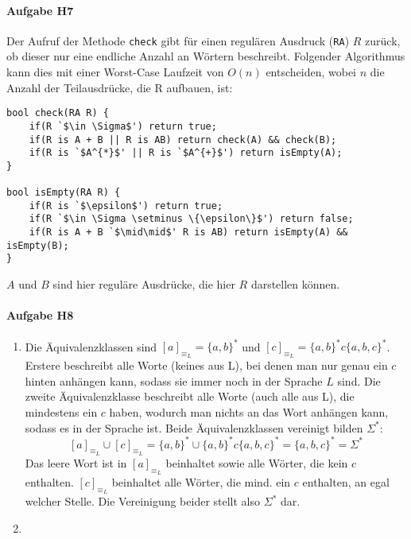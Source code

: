 \documentclass[11pt]{article}
\begin{document}

\paragraph{Aufgabe H7}
Der Aufruf der Methode \verb|check| gibt für einen regulären Ausdruck (\verb|RA|) $R$ zurück, ob dieser nur eine endliche Anzahl an Wörtern beschreibt. Folgender Algorithmus kann dies mit einer Worst-Case Laufzeit von $O(n)$ entscheiden, wobei $n$ die Anzahl der Teilausdrücke, die R aufbauen, ist:
\begin{lstlisting}[escapeinside=`']
bool check(RA R) {
	if(R `$\in \Sigma$') return true;
	if(R is A + B || R is AB) return check(A) && check(B);
	if(R is `$A^{*}$' || R is `$A^{+}$') return isEmpty(A);
}

bool isEmpty(RA R) {
	if(R is `$\epsilon$') return true;
	if(R `$\in \Sigma \setminus \{\epsilon\}$') return false;
	if(R is A + B `$\mid\mid$' R is AB) return isEmpty(A) && isEmpty(B);
}
\end{lstlisting}
$A$ und $B$ sind hier reguläre Ausdrücke, die hier $R$ darstellen können.

\paragraph{Aufgabe H8}
\begin{enumerate}[label=\alph*)]
\item 	Die Äquivalenzklassen sind $[a]_{\equiv _{L}} = \{a,b\}^{*}$ und $[c]_{\equiv _{L}} = \{a,b\}^{*}c\{a,b,c\}^{*}$. Erstere beschreibt alle Worte (keines aus L), bei denen man nur genau ein $c$ hinten anhängen kann, sodass sie immer noch in der Sprache $L$ sind. Die zweite Äquivalenzklasse beschreibt alle Worte (auch alle aus L), die mindestens ein $c$ haben, wodurch man nichts an das Wort anhängen kann, sodass es in der Sprache ist. Beide Äquivalenzklassen vereinigt bilden $\Sigma^{*}$:
\[[a]_{\equiv _{L}} \cup [c]_{\equiv _{L}} = \{a,b\}^{*} \cup \{a,b\}^{*}c\{a,b,c\}^{*} = \{a,b,c\}^{*} = \Sigma^{*}\]
Das leere Wort ist in $[a]_{\equiv _{L}}$ beinhaltet sowie alle Wörter, die kein $c$ enthalten. $[c]_{\equiv _{L}}$ beinhaltet alle Wörter, die mind. ein $c$ enthalten, an egal welcher Stelle. Die Vereinigung beider stellt also $\Sigma^{*}$ dar.

\item	
\end{enumerate}
\end{document}
